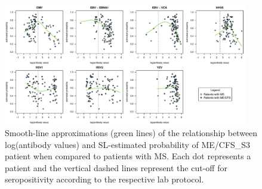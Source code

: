 \begin{figure}[h]
    \centering
    \includegraphics[width=0.95\textwidth]{chapter/2023-sym-and-herpesvirus/figures/figa4-ms-vs-s3.pdf}
    \caption[Smooth-line approximations of the relationship between log(antibody values) and SL-estimated probability of ME/CFS\_S3 patient when compared to patients with MS.]{Smooth-line approximations (green lines) of the relationship between log(antibody values) and SL-estimated probability of ME/CFS\_S3 patient when compared to patients with MS. Each dot represents a patient and the vertical dashed lines represent the cut-off for seropositivity according to the respective lab protocol.}
    \label{appendix:figa4-ms-vs-s3}
\end{figure}
